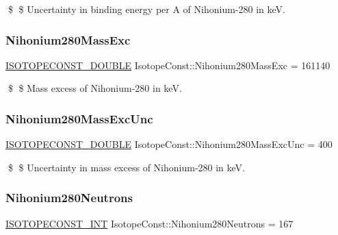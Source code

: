 \$ \$ Uncertainty in binding energy per A of Nihonium-\/280 in keV. \mbox{\label{group___isotope_const-_nihonium-_nh280_ga75441a51777688cce274682faa1f32ac}} 
\subsubsection{\texorpdfstring{Nihonium280\+Mass\+Exc}{Nihonium280MassExc}}
{\footnotesize\ttfamily \mbox{\hyperlink{group___isotope_const-_macros_ga8f45a7272ce02c0b4c65c44636ed719a}{I\+S\+O\+T\+O\+P\+E\+C\+O\+N\+S\+T\+\_\+\+D\+O\+U\+B\+LE}} Isotope\+Const\+::\+Nihonium280\+Mass\+Exc = 161140}

\$ \$ Mass excess of Nihonium-\/280 in keV. \mbox{\label{group___isotope_const-_nihonium-_nh280_ga69fa72b448286cf35fa75acb086a66d5}} 
\subsubsection{\texorpdfstring{Nihonium280\+Mass\+Exc\+Unc}{Nihonium280MassExcUnc}}
{\footnotesize\ttfamily \mbox{\hyperlink{group___isotope_const-_macros_ga8f45a7272ce02c0b4c65c44636ed719a}{I\+S\+O\+T\+O\+P\+E\+C\+O\+N\+S\+T\+\_\+\+D\+O\+U\+B\+LE}} Isotope\+Const\+::\+Nihonium280\+Mass\+Exc\+Unc = 400}

\$ \$ Uncertainty in mass excess of Nihonium-\/280 in keV. \mbox{\label{group___isotope_const-_nihonium-_nh280_gaafd5b7a7e6681481b4964700b2028b4a}} 
\subsubsection{\texorpdfstring{Nihonium280\+Neutrons}{Nihonium280Neutrons}}
{\footnotesize\ttfamily \mbox{\hyperlink{group___isotope_const-_macros_ga5f18360b3e99483a35c32d789e62621c}{I\+S\+O\+T\+O\+P\+E\+C\+O\+N\+S\+T\+\_\+\+I\+NT}} Isotope\+Const\+::\+Nihonium280\+Neutrons = 167}

